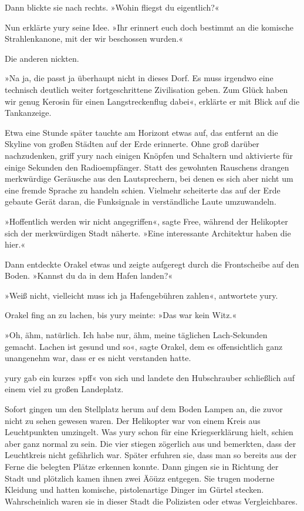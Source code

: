 Dann blickte sie nach rechts. »Wohin fliegst du eigentlich?«

Nun erklärte yury seine Idee. »Ihr erinnert euch doch bestimmt an die komische Strahlenkanone, mit der wir beschossen wurden.«

Die anderen nickten.

»Na ja, die passt ja überhaupt nicht in dieses Dorf. Es muss irgendwo eine technisch deutlich weiter fortgeschrittene Zivilisation geben. Zum Glück haben wir genug Kerosin für einen Langstreckenflug dabei«, erklärte er mit Blick auf die Tankanzeige.

Etwa eine Stunde später tauchte am Horizont etwas auf, das entfernt an die Skyline von großen Städten auf der Erde erinnerte. Ohne groß darüber nachzudenken, griff yury nach einigen Knöpfen und Schaltern und aktivierte für einige Sekunden den Radioempfänger. Statt des gewohnten Rauschens drangen merkwürdige Geräusche aus den Lautsprechern, bei denen es sich aber nicht um eine fremde Sprache zu handeln schien. Vielmehr scheiterte das auf der Erde gebaute Gerät daran, die Funksignale in verständliche Laute umzuwandeln.

»Hoffentlich werden wir nicht angegriffen«, sagte Free, während der Helikopter sich der merkwürdigen Stadt näherte. »Eine interessante Architektur haben die hier.«

Dann entdeckte Orakel etwas und zeigte aufgeregt durch die Frontscheibe auf den Boden. »Kannst du da in dem Hafen landen?«

»Weiß nicht, vielleicht muss ich ja Hafengebühren zahlen«, antwortete yury.

Orakel fing an zu lachen, bis yury meinte: »Das war kein Witz.«

»Oh, ähm, natürlich. Ich habe nur, ähm, meine täglichen Lach-Sekunden gemacht. Lachen ist gesund und so«, sagte Orakel, dem es offensichtlich ganz unangenehm war, dass er es nicht verstanden hatte.

yury gab ein kurzes »pff« von sich und landete den Hubschrauber schließlich auf einem viel zu großen Landeplatz.

Sofort gingen um den Stellplatz herum auf dem Boden Lampen an, die zuvor nicht zu sehen gewesen waren. Der Helikopter war von einem Kreis aus Leuchtpunkten umzingelt. Was yury schon für eine Kriegserklärung hielt, schien aber ganz normal zu sein. Die vier stiegen zögerlich aus und bemerkten, dass der Leuchtkreis nicht gefährlich war. Später erfuhren sie, dass man so bereits aus der Ferne die belegten Plätze erkennen konnte. Dann gingen sie in Richtung der Stadt und plötzlich kamen ihnen zwei Äöüzz entgegen. Sie trugen moderne Kleidung und hatten komische, pistolenartige Dinger im Gürtel stecken. Wahrscheinlich waren sie in dieser Stadt die Polizisten oder etwas Vergleichbares.

